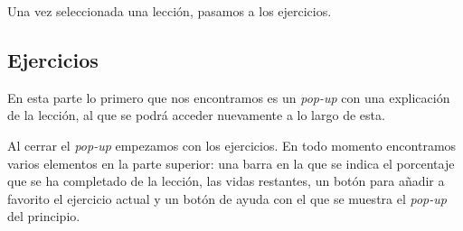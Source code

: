 \begin{figure}[H]
\begin{center}
\end{center}
\end{figure}

Una vez seleccionada una lección, pasamos a los ejercicios.

\subsection{Ejercicios}

En esta parte lo primero que nos encontramos es un \textit{pop-up} con una explicación de la lección, al que se podrá acceder nuevamente a lo largo de esta. 

\begin{figure}[H]
\begin{center}
\end{center}
\end{figure}

Al cerrar el \textit{pop-up} empezamos con los ejercicios. En todo momento encontramos varios elementos en la parte superior: una barra en la que se indica el porcentaje que se ha completado de la lección, las vidas restantes, un botón para añadir a favorito el ejercicio actual y un botón de ayuda con el que se muestra el \textit{pop-up} del principio.

